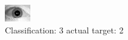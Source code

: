\begin{figure}[h!]
\begin{center}
\includegraphics[width=0.60\columnwidth]{figures/ID1643_class_3_target_2.png}
\end{center}
\caption{ Classification: 3 actual target: 2}
\label{fig:ID1643_class_3_target_2}
\end{figure}
